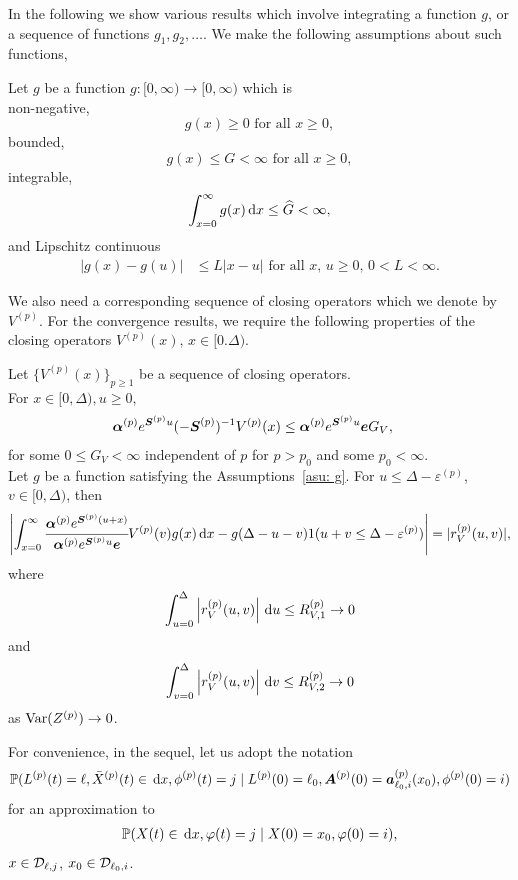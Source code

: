 In the following we show various results which involve integrating a function \(g\), or a sequence of functions \(g_1,g_2,\dots\). We make the following assumptions about such functions, 
\begin{asu}\label{asu: g}
	Let \(g\) be a function \(g:[0,\infty)\to [0,\infty)\) which is \\
	\subasu \label{asu: g non-neg} non-negative, 
	\[g(x) \geq 0 \mbox{ for all } x \geq 0,\]
	\subasu bounded, 
	\[g(x) \leq G < \infty \mbox{ for all } x \geq 0,\]
	\subasu integrable, 
	\[\int_{x=0}^\infty g(x)\, \mathrm{d} x \leq \widehat G < \infty,\]
	\subasu \label{asu: lipschitz} and Lipschitz continuous 
	\begin{align}
		|g(x) - g(u)|&\leq L|x - u| \mbox{ for all } x,\, u \geq 0,\, 0<L<\infty.
	\end{align}
\end{asu}

We also need a corresponding sequence of closing operators which we denote by \(V^{(p)}\). For the convergence results, we require the following properties of the closing operators \(V^{(p)}(x),\, x \in[0.\Delta)\).
\begin{property}\label{properties: some props}
	Let \(\{V^{(p)}(x)\}_{p\geq 1}\) be a sequence of closing operators. \\
	\subproperty \label{properties: 1} For \(x\in[0,\Delta),u\geq 0\),  
        \begin{align*}
        		\boldsymbol \alpha^{(p)} e^{\boldsymbol S^{(p)}u}(-\boldsymbol S^{(p)})^{-1} V^{(p)}(x) &\leq \boldsymbol \alpha^{(p)} e^{\boldsymbol S^{(p)}u} \boldsymbol e G_V,
	\end{align*}
	for some \(0\leq G_V<\infty\) independent of \(p\) for \(p>p_0\) and some \(p_0<\infty\). \\
	\subproperty \label{properties: 2} Let \(g\) be a function satisfying the Assumptions~\ref{asu: g}. For \(u\leq \Delta-\varepsilon^{(p)}\), \(v\in[0,\Delta)\), then
	\[\left|\int_{x=0}^\infty \cfrac{\boldsymbol \alpha^{(p)} e^{\boldsymbol{S}^{(p)}(u+x)} }{\boldsymbol \alpha^{(p)} e^{\boldsymbol{S}^{(p)}u} \boldsymbol e} V^{(p)}(v)g(x)\, \mathrm{d} x -g(\Delta-u-v) 1(u+v\leq\Delta-\varepsilon^{(p)})\right| =  |r_V^{(p)}(u,v)|,\]
	where 
	\[ \int_{u=0}^{\Delta}\left| r_V^{(p)}(u,v)\right| \, \mathrm{d} u  \leq R_{V,1}^{(p)} \to 0\]
	and 
	\[ \int_{v=0}^{\Delta}\left| r_V^{(p)}(u,v)\right| \, \mathrm{d} v  \leq R_{V,2}^{(p)} \to 0\]
	as \(\mathrm{Var}(Z^{(p)})\to 0\). 
\end{property}

For convenience, in the sequel, let us adopt the notation 
\begin{align}
	\mathbb P(L^{(p)}(t) = \ell, \bar X^{(p)}(t)\in\, \mathrm{d} x, \phi^{(p)}(t) = j\mid L^{(p)}(0)=\ell_0, \boldsymbol A^{(p)}(0) = \boldsymbol  a_{\ell_0,i}^{(p)}(x_0), \phi^{(p)}(0) = i) 
\end{align}
for an approximation to 
\begin{align}
	\mathbb P(X(t)\in\, \mathrm{d} x, \varphi(t) = j\mid X(0)=x_0, \varphi(0) = i),
\end{align}
\(x\in \mathcal{D}_{\ell,j}\), \(x_0\in\mathcal{D}_{\ell_0,i}\).

